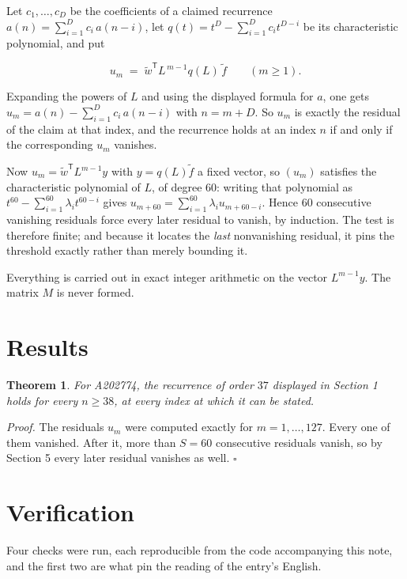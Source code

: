 \documentclass[11pt]{article}
\newtheorem{theorem}{Theorem}
\theoremstyle{definition}
\begin{document}
Let $c_1,\dots,c_D$ be the coefficients of a claimed recurrence $a(n) = \sum_{i=1}^{D} c_i\,a(n-i)$, let $q(t) = t^{D} - \sum_{i=1}^{D} c_i t^{D-i}$ be its characteristic polynomial, and put

\[u_m \;=\; \tilde w^{\mathsf T} L^{\,m-1} q(L)\,\tilde f \qquad (m \ge 1).\]

Expanding the powers of $L$ and using the displayed formula for $a$, one gets $u_m = a(n) - \sum_{i=1}^{D} c_i\,a(n-i)$ with $n = m + D$. So $u_m$ is exactly the residual of the claim at that index, and the recurrence holds at an index $n$ if and only if the corresponding $u_m$ vanishes.

Now $u_m = \tilde w^{\mathsf T} L^{m-1} y$ with $y = q(L)\tilde f$ a fixed vector, so $(u_m)$ satisfies the characteristic polynomial of $L$, of degree $60$: writing that polynomial as $t^{60} - \sum_{i=1}^{60} \lambda_i t^{60-i}$ gives $u_{m+60} = \sum_{i=1}^{60} \lambda_i u_{m+60-i}$. Hence $60$ consecutive vanishing residuals force every later residual to vanish, by induction. The test is therefore finite; and because it locates the {\itshape last} nonvanishing residual, it pins the threshold exactly rather than merely bounding it.

Everything is carried out in exact integer arithmetic on the vector $L^{m-1}y$. The matrix $M$ is never formed.

\section{Results}

\begin{theorem} For A202774, the recurrence of order $37$ displayed in Section 1 holds for every $n \ge 38$, at every index at which it can be stated.\end{theorem}

{\itshape Proof.} The residuals $u_m$ were computed exactly for $m = 1,\dots,127$. Every one of them vanished. After it, more than $S = 60$ consecutive residuals vanish, so by Section 5 every later residual vanishes as well. $\square$

\section{Verification}

Four checks were run, each reproducible from the code accompanying this note, and the first two are what pin the reading of the entry's English.
\end{document}
